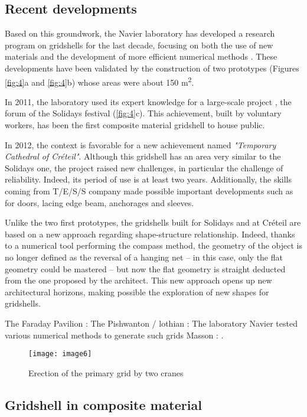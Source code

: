 \subsection{Recent developments}
Based on this groundwork, the Navier laboratory has developed a research program on gridshells for the last decade, focusing on both the use of new materials and the development of more efficient numerical methods \citep{Douthe2007}. These developments have been validated by the construction of two prototypes (Figures \ref{fig:4}a and \ref{fig:4}b) whose areas were about 150 m\textsuperscript{2}.


In 2011, the laboratory used its expert knowledge for a large-scale project \citep{Baverel2012}, the forum of the Solidays festival (\autoref{fig:4}c). This achievement, built by voluntary workers, has been the first composite material gridshell to house public.

In 2012, the context is favorable for a new achievement named \emph{"Temporary Cathedral of Créteil"}. Although this gridshell has an area very similar to the Solidays one, the project raised new challenges, in particular the challenge of reliability. Indeed, its period of use is at least two years. Additionally, the skills coming from T/E/S/S company made possible important developments such as for doors, lacing edge beam, anchorages and sleeves.

Unlike the two first prototypes, the gridshells built for Solidays and at Créteil are based on a new approach regarding shape-structure relationship. Indeed, thanks to a numerical tool performing the compass method, the geometry of the object is no longer defined as the reversal of a hanging net – in this case, only the flat geometry could be mastered \citep{Addis2013} – but now the flat geometry is straight deducted from the one proposed by the architect.
This new approach opens up new architectural horizons, making possible the exploration of new shapes for gridshells.

The Faraday Pavilion : \cite{Nicholas2013}
The Pishwanton / lothian : \cite{Pishwanton2003}
The laboratory Navier tested various numerical methods to generate such grids \citep{Bouhaya2009}
Masson :  \cite{Masson2017}.
\begin{figure}[t]
	\centering
		\texttt{[image: image6]}
	\caption{Erection of the primary grid by two cranes}
	\label{fig:5}
\end{figure}


\subsection{Gridshell in composite material}

